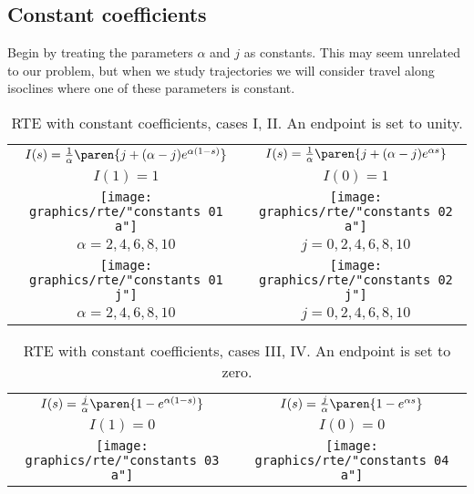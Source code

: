 \subsection{\label{subsec:constant coefficients}Constant coefficients}

Begin by treating the parameters $\alpha$ and $j$ as constants. This may seem unrelated to our problem, but when we study trajectories we will consider travel along isoclines where one of these parameters is constant.

%
\begin{landscape}
%
\begin{table}[htdp]
\caption[RTE with constant coefficients, cases I, II]{RTE with constant coefficients, cases I, II. An endpoint is set to unity.}
\begin{center}
\begin{tabular}{cc}
%
$I(s) = \frac{1}{\alpha}\paren{j+(\alpha-j)e^{\alpha(1-s)}}$ & $I(s) = \frac{1}{\alpha}\paren{j+(\alpha-j)e^{\alpha s}}$ \\[4pt]
%
$I(1) = 1$ & $I(0) = 1$ \\
%
\texttt{[image: graphics/rte/"constants 01 a"]} &
\texttt{[image: graphics/rte/"constants 02 a"]} \\[-12pt]
%
$\alpha = 2, 4, 6, 8, 10$& $j = 0, 2, 4, 6, 8, 10$\\
%
\texttt{[image: graphics/rte/"constants 01 j"]} &
\texttt{[image: graphics/rte/"constants 02 j"]} \\[-12pt]
%
$\alpha = 2, 4, 6, 8, 10$ & $j = 0, 2, 4, 6, 8, 10$\\
%
\end{tabular}
\end{center}
\label{tab:ode:constant:1}
\end{table}
%
%
\begin{table}[htdp]
\caption[RTE with constant coefficients, cases III, IV]{RTE with constant coefficients, cases III, IV. An endpoint is set to zero.}
\begin{center}
\begin{tabular}{cc}
%
$I(s) = \frac{j}{\alpha}\paren{1-e^{\alpha(1-s)}}$ & $I(s) = \frac{j}{\alpha}\paren{1-e^{\alpha s}}$ \\[4pt]
%
$I(1) = 0$ & $I(0) = 0$ \\
%
\texttt{[image: graphics/rte/"constants 03 a"]} &
\texttt{[image: graphics/rte/"constants 04 a"]} \\[-12pt]
%

\end{tabular}
\end{center}
\end{table}
\end{landscape}
